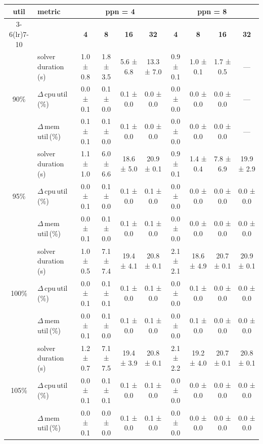 \begin{tabular}{@{}c l *{8}{c}@{}}
\toprule
\multirow{2}{*}{\textbf{util}} & \multirow{2}{*}{\textbf{metric}} &\multicolumn{4}{c}{\textbf{ppn = 4}} & \multicolumn{4}{c}{\textbf{ppn = 8}}\\
\cmidrule(lr){3-6}\cmidrule(lr){7-10}
 &  & \textbf{4} & \textbf{8} & \textbf{16} & \textbf{32} & \textbf{4} & \textbf{8} & \textbf{16} & \textbf{32}\\
\midrule
\multirow{3}{*}{90\%}
& solver\,duration\,(s) & 1.0 ± 0.8 & 1.8 ± 3.5 & 5.6 ± 6.8 & 13.3 ± 7.0 & 0.9 ± 0.1 & 1.0 ± 0.1 & 1.7 ± 0.5 & \multicolumn{1}{c}{—} \\
& $\Delta$\,cpu\,util\,(\%) & 0.0 ± 0.1 & 0.1 ± 0.0 & 0.1 ± 0.0 & 0.0 ± 0.0 & 0.0 ± 0.0 & 0.0 ± 0.0 & 0.0 ± 0.0 & \multicolumn{1}{c}{—} \\
& $\Delta$\,mem\,util\,(\%) & 0.1 ± 0.1 & 0.1 ± 0.0 & 0.1 ± 0.0 & 0.0 ± 0.0 & 0.0 ± 0.0 & 0.0 ± 0.0 & 0.0 ± 0.0 & \multicolumn{1}{c}{—} \\
\midrule
\multirow{3}{*}{95\%}
& solver\,duration\,(s) & 1.1 ± 1.0 & 6.0 ± 6.6 & 18.6 ± 5.0 & 20.9 ± 0.1 & 0.9 ± 0.1 & 1.4 ± 0.4 & 7.8 ± 6.9 & 19.9 ± 2.9 \\
& $\Delta$\,cpu\,util\,(\%) & 0.0 ± 0.1 & 0.1 ± 0.0 & 0.1 ± 0.0 & 0.1 ± 0.0 & 0.0 ± 0.0 & 0.0 ± 0.0 & 0.0 ± 0.0 & 0.0 ± 0.0 \\
& $\Delta$\,mem\,util\,(\%) & 0.0 ± 0.1 & 0.1 ± 0.0 & 0.1 ± 0.0 & 0.1 ± 0.0 & 0.0 ± 0.0 & 0.0 ± 0.0 & 0.0 ± 0.0 & 0.0 ± 0.0 \\
\midrule
\multirow{3}{*}{100\%}
& solver\,duration\,(s) & 1.0 ± 0.5 & 7.1 ± 7.4 & 19.4 ± 4.1 & 20.8 ± 0.1 & 2.1 ± 2.1 & 18.6 ± 4.9 & 20.7 ± 0.1 & 20.9 ± 0.1 \\
& $\Delta$\,cpu\,util\,(\%) & 0.0 ± 0.1 & 0.1 ± 0.1 & 0.1 ± 0.0 & 0.1 ± 0.0 & 0.0 ± 0.0 & 0.1 ± 0.0 & 0.0 ± 0.0 & 0.0 ± 0.0 \\
& $\Delta$\,mem\,util\,(\%) & 0.0 ± 0.1 & 0.1 ± 0.0 & 0.1 ± 0.0 & 0.1 ± 0.0 & 0.0 ± 0.0 & 0.1 ± 0.0 & 0.0 ± 0.0 & 0.0 ± 0.0 \\
\midrule
\multirow{3}{*}{105\%}
& solver\,duration\,(s) & 1.2 ± 0.7 & 7.1 ± 7.5 & 19.4 ± 3.9 & 20.8 ± 0.1 & 2.1 ± 2.2 & 19.2 ± 4.0 & 20.7 ± 0.1 & 20.8 ± 0.1 \\
& $\Delta$\,cpu\,util\,(\%) & 0.0 ± 0.1 & 0.1 ± 0.1 & 0.1 ± 0.0 & 0.1 ± 0.0 & 0.0 ± 0.0 & 0.0 ± 0.0 & 0.0 ± 0.0 & 0.0 ± 0.0 \\
& $\Delta$\,mem\,util\,(\%) & 0.0 ± 0.1 & 0.0 ± 0.0 & 0.1 ± 0.0 & 0.1 ± 0.0 & 0.0 ± 0.0 & 0.0 ± 0.0 & 0.0 ± 0.0 & 0.0 ± 0.0 \\
\bottomrule
\end{tabular}
